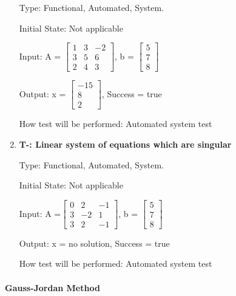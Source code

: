 \documentclass[12pt, titlepage]{article}
\newcounter{tnum}
\begin{document}
\begin{enumerate}
Type: Functional, Automated, System.
					
Initial State: Not applicable
					
Input: A =  $\begin{bmatrix} 
1 & 3 & -2 \\
3 & 5 & 6\\
2 & 4 & 3
\end{bmatrix}$, b = $\begin{bmatrix} 
5\\
7\\
8 
\end{bmatrix}$
					
Output: x = $\begin{bmatrix} 
-15\\
8\\
2 
\end{bmatrix}$, Success = true
					
How test will be performed: Automated system test

\item{\textbf{T-\thetnum \label{t-gaussian
elimination_three}: Linear system of equations which are singular}}

Type: Functional, Automated, System.
					
Initial State: Not applicable
					
Input: A =$\begin{bmatrix} 
0 & 2 & -1 \\
3 & -2 & 1\\
3 & 2 & -1
\end{bmatrix}$, b = $\begin{bmatrix} 
5\\
7\\
8 
\end{bmatrix}$
					
Output: x = no solution, Success = true
					
How test will be performed: Automated system test

\end{enumerate}



\paragraph{Gauss-Jordan Method }
\end{document}
